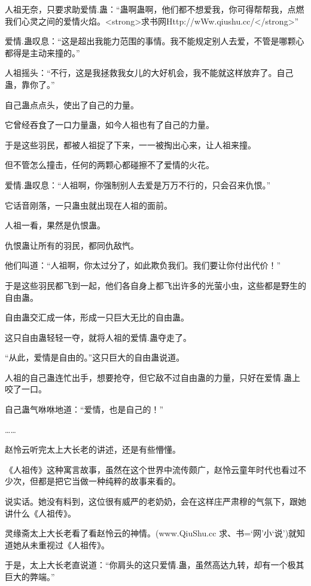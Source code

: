 
\begin{this_body}

人祖无奈，只要求助爱情.蛊：“蛊啊蛊啊，他们都不想爱我，你可得帮帮我，点燃我们心灵之间的爱情火焰。<strong>求书网Http://wWw.qiushu.cc/</strong>”

爱情.蛊叹息：“这是超出我能力范围的事情。我不能规定别人去爱，不管是哪颗心都得是主动来撞的。”

人祖摇头：“不行，这是我拯救我女儿的大好机会，我不能就这样放弃了。自己蛊，靠你了。”

自己蛊点点头，使出了自己的力量。

它曾经吞食了一口力量蛊，如今人祖也有了自己的力量。

于是这些羽民，都被人祖捉了下来，一一被掏出心来，让人祖来撞。

但不管怎么撞击，任何的两颗心都碰擦不了爱情的火花。

爱情.蛊叹息：“人祖啊，你强制别人去爱是万万不行的，只会召来仇恨。”

它话音刚落，一只蛊虫就出现在人祖的面前。

人祖一看，果然是仇恨蛊。

仇恨蛊让所有的羽民，都同仇敌忾。

他们叫道：“人祖啊，你太过分了，如此欺负我们。我们要让你付出代价！”

于是这些羽民都飞到一起，他们各自身上都飞出许多的光萤小虫，这些都是野生的自由蛊。

自由蛊交汇成一体，形成一只巨大无比的自由蛊。

这只自由蛊轻轻一夺，就将人祖的爱情.蛊夺走了。

“从此，爱情是自由的。”这只巨大的自由蛊说道。

人祖的自己蛊连忙出手，想要抢夺，但它敌不过自由蛊的力量，只好在爱情.蛊上咬了一口。

自己蛊气咻咻地道：“爱情，也是自己的！”

……

赵怜云听完太上大长老的讲述，还是有些懵懂。

《人祖传》这种寓言故事，虽然在这个世界中流传颇广，赵怜云童年时代也看过不少次，但都是把它当做一种纯粹的故事来看的。

说实话。她没有料到，这位很有威严的老奶奶，会在这样庄严肃穆的气氛下，跟她讲什么《人祖传》。

灵缘斋太上大长老看了看赵怜云的神情。(www.QiuShu.cc 求、书=‘网’小‘说’)就知道她从未重视过《人祖传》。

于是，太上大长老直说道：“你肩头的这只爱情.蛊，虽然高达九转，却有一个极其巨大的弊端。”


\end{this_body}
